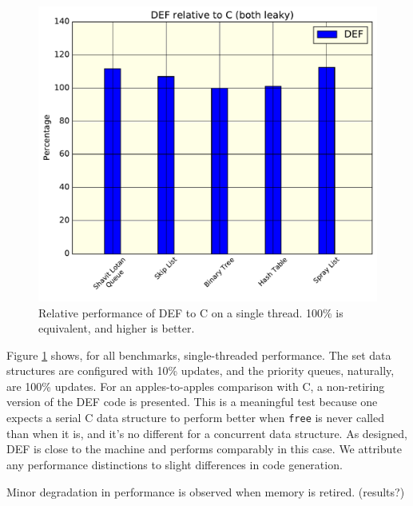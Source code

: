 \begin{figure}[htbp!]
  \centering
  \includegraphics[scale=0.25]{gfx/RelativePerf.pdf}
  \caption{Relative performance of DEF to C on a single thread.  100\% is equivalent, and higher is better.}
  \label{fig:relativeperf}
\end{figure}

Figure \ref{fig:relativeperf} shows, for all benchmarks, single-threaded performance.  The set data structures are configured with 10\% updates, and the priority queues, naturally, are 100\% updates.  For an apples-to-apples comparison with C, a non-retiring version of the DEF code is presented.  This is a meaningful test because one expects a serial C data structure to perform better when \texttt{free} is never called than when it is, and it's no different for a concurrent data structure.  As designed, DEF is close to the machine and performs comparably in this case.  We attribute any performance distinctions to slight differences in code generation.

Minor degradation in performance is observed when memory is retired. (results?)

